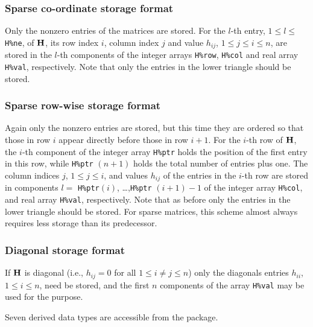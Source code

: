 \documentclass{galahad}
\begin{document}
\subsubsection{Sparse co-ordinate storage format}\label{coordinate}
Only the nonzero entries of the matrices are stored.
For the $l$-th entry, $1 \leq l \leq$ {\tt H\%ne}, of ${\mathbf{H}}$, 
its row index $i$, column index $j$ and value $h_{ij}$,
$1 \leq j \leq i \leq n$,
are stored in the $l$-th components of the integer arrays {\tt H\%row},
{\tt H\%col} and real array {\tt H\%val}, respectively.
Note that only the entries in the lower triangle should be stored.

\subsubsection{Sparse row-wise storage format}\label{rowwise}
Again only the nonzero entries are stored, but this time
they are ordered so that those in row $i$ appear directly before those
in row $i+1$. For the $i$-th row of ${\mathbf{H}}$, the $i$-th component of the
integer array {\tt H\%ptr} holds the position of the first entry in this row,
while {\tt H\%ptr} $(n+1)$ holds the total number of entries plus one.
The column indices $j$, $1 \leq j \leq i$, and values $h_{ij}$ of the
entries in the $i$-th row are stored in components
$l =$ {\tt H\%ptr}$(i)$, \ldots ,{\tt H\%ptr} $(i+1)-1$ of the
integer array {\tt H\%col}, and real array {\tt H\%val}, respectively.
Note that as before only the entries in the lower triangle should be stored.
For sparse matrices, this scheme almost always requires less storage than
its predecessor.

\subsubsection{Diagonal storage format}\label{diagonal}
If ${\mathbf{H}}$ is diagonal (i.e., $h_{ij} = 0$ for all $1 \leq i \neq j \leq n$)
only the diagonals entries $h_{ii}$, $1 \leq i \leq n$,  need be stored,
and the first $n$ components of the array {\tt H\%val} may be used for
the purpose.





\galtypes
Seven derived data types are accessible from the package.

\end{document}
